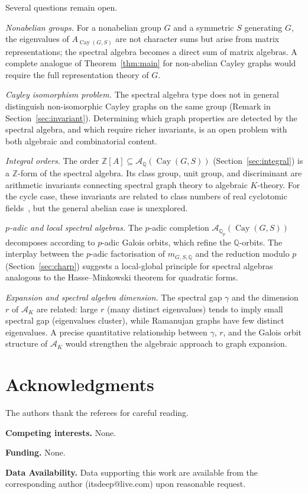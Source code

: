\documentclass[12pt]{amsart}
\newenvironment{ack}{\section*{Acknowledgments}\noindent}{}
\numberwithin{equation}{section}
\theoremstyle{plain}
\theoremstyle{definition}
\DeclareMathOperator{\Cay}{Cay}
\newcommand{\Z}{\mathbb{Z}}
\newcommand{\Q}{\mathbb{Q}}
\newcommand{\calA}{\mathcal{A}}
\begin{document}
Several questions remain open.

\emph{Nonabelian groups.}  For a nonabelian group $G$ and a symmetric $S$
generating $G$, the eigenvalues of $A_{\Cay(G,S)}$ are not character sums
but arise from matrix representations; the spectral algebra becomes a direct
sum of matrix algebras.  A complete analogue of Theorem~\ref{thm:main} for
non-abelian Cayley graphs would require the full representation theory of $G$.

\emph{Cayley isomorphism problem.}  The spectral algebra type does not in
general distinguish non-isomorphic Cayley graphs on the same group
(Remark in Section~\ref{sec:invariant}).  Determining which graph properties
are detected by the spectral algebra, and which require richer invariants,
is an open problem with both algebraic and combinatorial content.

\emph{Integral orders.}  The order $\Z[A] \subseteq \calA_\Q(\Cay(G,S))$
(Section~\ref{sec:integral}) is a $\Z$-form of the spectral algebra.
Its class group, unit group, and discriminant are arithmetic invariants
connecting spectral graph theory to algebraic $K$-theory.  For the cycle
case, these invariants are related to class numbers of real cyclotomic
fields~\cite{Was97}, but the general abelian case is unexplored.

\emph{$p$-adic and local spectral algebras.}  The $p$-adic completion
$\calA_{\Q_p}(\Cay(G,S))$ decomposes according to $p$-adic Galois orbits,
which refine the $\Q$-orbits.  The interplay between the $p$-adic
factorisation of $m_{G,S,\Q}$ and the reduction modulo $p$
(Section~\ref{sec:charp}) suggests a local-global principle for spectral
algebras analogous to the Hasse--Minkowski theorem for quadratic forms.

\emph{Expansion and spectral algebra dimension.}  The spectral gap
$\gamma$ and the dimension $r$ of $\calA_K$ are related: large $r$ (many
distinct eigenvalues) tends to imply small spectral gap (eigenvalues
cluster), while Ramanujan graphs have few distinct eigenvalues.  A precise
quantitative relationship between $\gamma$, $r$, and the Galois orbit
structure of $\calA_K$ would strengthen the algebraic approach to graph
expansion.

\begin{ack}
The authors thank the referees for careful reading.

\medskip
\noindent\textbf{Competing interests.}
None.

\medskip
\noindent\textbf{Funding.}
None.

\medskip
\noindent\textbf{Data Availability.}
Data supporting this work are available from the corresponding author
(itsdeep@live.com) upon reasonable request.
\end{ack}
\end{document}
